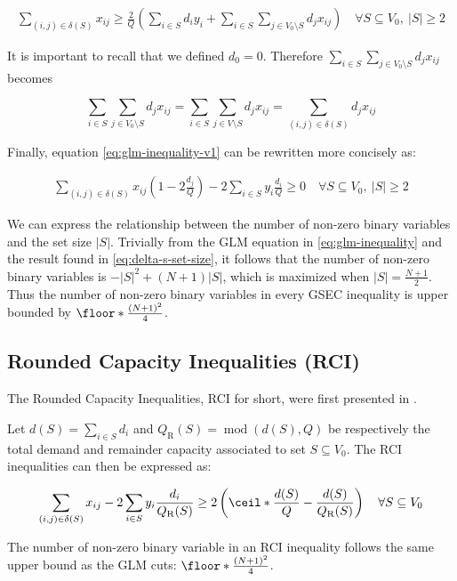 \begin{equation}\label{eq:glm-inequality-v1}
	\begin{split}
		\sum_{(i, j) \in \delta(S)} x_{ij} \ge \frac{2}{Q} \left(  \sum_{i \in S} d_i y_i + \sum_{i \in S} \sum_{j \in V_0 \setminus S} d_j  x_{ij}\right) \quad \forall S \subseteq V_0,\ |S| \ge 2
	\end{split}
\end{equation}

It is important to recall that we defined $d_0 = 0$.
Therefore $\sum_{i \in S} \sum_{j \in V_0 \setminus S} d_j  x_{ij}$ becomes

\begin{equation}
	\sum_{i \in S} \sum_{j \in V_0 \setminus S} d_j  x_{ij} = \sum_{i \in S} \sum_{j \in V \setminus S} d_j  x_{ij} = \sum_{(i, j) \in \delta(S)} d_j x_{ij}
\end{equation}

Finally, equation \eqref{eq:glm-inequality-v1} can be rewritten more concisely as:

\begin{equation}\label{eq:glm-inequality}
	\begin{split}
		\sum_{(i, j) \in \delta(S)} x_{ij} \left( 1 - 2 \frac{d_j}{Q} \right)  -2 \sum_{i \in S} y_i \frac{d_i}{Q}  \ge  0   \quad \forall S \subseteq V_0,\ |S| \ge 2
	\end{split}
\end{equation}


We can express the relationship between the number of non-zero binary variables and the set size $|S|$.
Trivially from the GLM equation in \eqref{eq:glm-inequality} and the result found in \eqref{eq:delta-s-set-size}, it follows that the number of non-zero binary variables is $-|S|^2 + (N + 1)|S|$, which is maximized when $|S| = \frac{N+1}{2}$.
Thus the number of non-zero binary variables in every GSEC inequality is upper bounded by $\floor*{ \frac{\left( N + 1 \right)^2}{4}}$.


\subsection{Rounded Capacity Inequalities (RCI)}
The Rounded Capacity Inequalities, RCI for short, were first presented in \cite{achuthan_capacitated_1998}.

Let $d(S) = \sum_{i \in S} d_i$ and $Q_{\mathrm{R}}(S) = \mathop{mod}\left(d(S), Q \right)$ be respectively the total demand and remainder capacity associated to set $S \subseteq V_0$.
The RCI inequalities can then be expressed as:

\begin{equation}
	\begin{split}
		\sum_{(i, j) \in \delta(S)} x_{ij} -2 \sum_{i \in S} y_i {\frac{d_i}{Q_\mathrm{R}(S)}}    \ge   2 \left( \ceil*{ \frac{d(S)}{Q}} - \frac{d(S)}{Q_{\mathrm{R}}(S)} \right) \quad \forall S \subseteq V_0
	\end{split}
\end{equation}

The number of non-zero binary variable in an RCI inequality follows the same upper bound as the GLM cuts: $\floor*{\frac{\left( N + 1\right)^2}{4}}$.
